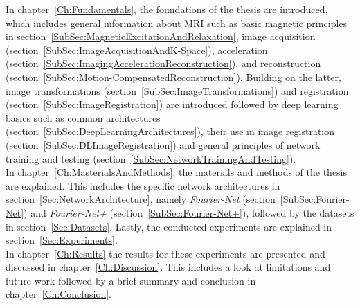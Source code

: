 In chapter~\ref{Ch:Fundamentals}, the foundations of the thesis are introduced, which includes general information about MRI such as basic magnetic principles in section~\ref{SubSec:MagneticExcitationAndRelaxation}, image acquisition (section~\ref{SubSec:ImageAcquisitionAndK-Space}), acceleration (section~\ref{SubSec:ImagingAccelerationReconstruction}), and reconstruction (section~\ref{SubSec:Motion-CompensatedReconstruction}). Building on the latter, image transformations (section~\ref{SubSec:ImageTransformations}) and registration (section~\ref{SubSec:ImageRegistration}) are introduced followed by deep learning basics such as common architectures (section~\ref{SubSec:DeepLearningArchitectures}), their use in image registration (section~\ref{SubSec:DLImageRegistration}) and general principles of network training and testing (section~\ref{SubSec:NetworkTrainingAndTesting}).\\
In chapter~\ref{Ch:MasterialsAndMethods}, the materials and methods of the thesis are explained. This includes the specific network architectures in section~\ref{Sec:NetworkArchitecture}, namely \emph{Fourier-Net} (section~\ref{SubSec:Fourier-Net}) and \emph{Fourier-Net+} (section~\ref{SubSec:Fourier-Net+}), followed by the datasets in section~\ref{Sec:Datasets}.
Lastly, the conducted experiments are explained in section~\ref{Sec:Experiments}.\\
In chapter~\ref{Ch:Results} the results for these experiments are presented and discussed in chapter~\ref{Ch:Discussion}. This includes a look at limitations and future work followed by a brief summary and conclusion in chapter~\ref{Ch:Conclusion}.
